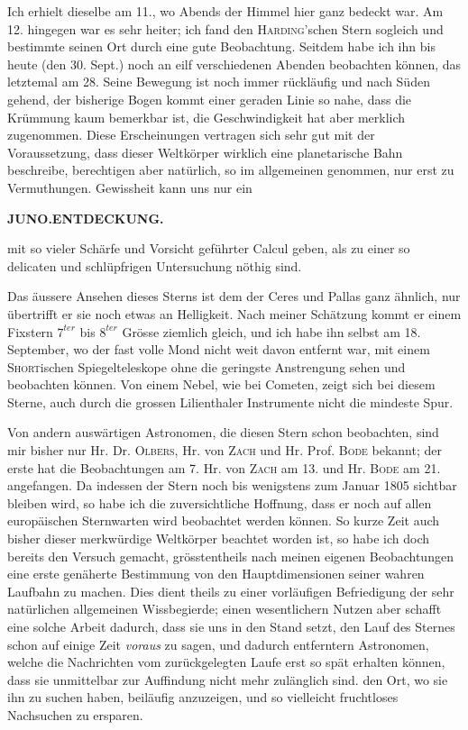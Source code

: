 Ich erhielt dieselbe am 11., wo Abends der Himmel hier ganz bedeckt war. Am 12. hingegen war es sehr heiter; ich fand den \textsc{Harding}'schen Stern sogleich und bestimmte seinen Ort durch eine gute Beobachtung. Seitdem habe ich ihn bis heute (den 30. Sept.) noch an eilf verschiedenen Abenden beobachten können, das letztemal am 28. Seine Bewegung ist noch immer rückläufig und nach Süden gehend, der bisherige Bogen kommt einer geraden Linie so nahe, dass die Krümmung kaum bemerkbar ist, die Geschwindigkeit hat aber merklich zugenommen. Diese Erscheinungen vertragen sich sehr gut mit der Voraussetzung, dass dieser Weltkörper wirklich eine planetarische Bahn beschreibe, berechtigen aber natürlich, so im allgemeinen genommen, nur erst zu Vermuthungen. Gewissheit kann uns nur ein\par
\clearpage
\thispagestyle{empty}
\noindent{}%
\makebox[12mm][l]{}%
\parbox[t]{\dimexpr\linewidth-24mm\relax}{\centering\footnotesize\bfseries JUNO.\quad ENTDECKUNG.\par}%
\par\nobreak\medskip
\noindent mit so vieler Schärfe und Vorsicht geführter Calcul geben, als zu einer so delicaten und
schlüpfrigen Untersuchung nöthig sind.

Das äussere Ansehen dieses Sterns ist dem der Ceres und Pallas ganz ähnlich, nur übertrifft
er sie noch etwas an Helligkeit. Nach meiner Schätzung kommt er einem Fixstern $7^{ter}$ bis
$8^{ter}$ Grösse ziemlich gleich, und ich habe ihn selbst am 18. September, wo der fast volle
Mond nicht weit davon entfernt war, mit einem \textsc{Short}ischen Spiegelteleskope ohne die
geringste Anstrengung sehen und beobachten können. Von einem Nebel, wie bei Cometen, zeigt sich
bei diesem Sterne, auch durch die grossen Lilienthaler Instrumente nicht die mindeste Spur.

Von andern auswärtigen Astronomen, die diesen Stern schon beobachten, sind mir bisher nur
Hr. Dr. \textsc{Olbers}, Hr. von \textsc{Zach} und Hr. Prof. \textsc{Bode} bekannt; der erste hat
die Beobachtungen am 7. Hr. von \textsc{Zach} am 13. und Hr. \textsc{Bode} am 21. angefangen. Da
indessen der Stern noch bis wenigstens zum Januar 1805 sichtbar bleiben wird, so habe ich die
zuversichtliche Hoffnung, dass er noch auf allen europäischen Sternwarten wird beobachtet werden
können. So kurze Zeit auch bisher dieser merkwürdige Weltkörper beachtet worden ist, so habe
ich doch bereits den Versuch gemacht, grösstentheils nach meinen eigenen Beobachtungen eine erste
genäherte Bestimmung von den Hauptdimensionen seiner wahren Laufbahn zu machen. Dies dient
theils zu einer vorläufigen Befriedigung der sehr natürlichen allgemeinen Wissbegierde; einen
wesentlichern Nutzen aber schafft eine solche Arbeit dadurch, dass sie uns in den Stand setzt, den
Lauf des Sternes schon auf einige Zeit \emph{voraus} zu sagen, und dadurch entferntern Astronomen,
welche die Nachrichten vom zurückgelegten Laufe erst so spät erhalten können, dass sie
unmittelbar zur Auffindung nicht mehr zulänglich sind. den Ort, wo sie ihn zu suchen haben,
beiläufig anzuzeigen, und so vielleicht fruchtloses Nachsuchen zu ersparen.

